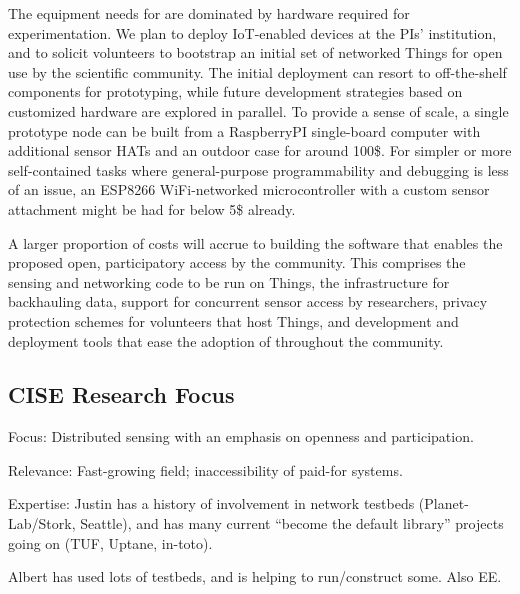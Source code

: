 The equipment needs for \sysname are dominated by hardware required
for experimentation. We plan to deploy \gls{IoT}-enabled devices
at the PIs' institution, and to solicit volunteers to bootstrap an
initial set of networked Things for open use by the scientific community.
The initial deployment can resort to off-the-shelf components
for prototyping, while future development strategies based on
customized hardware are explored in parallel.
To provide a sense of scale, a single prototype node can be built
from a RaspberryPI single-board computer with additional sensor
\glspl{HAT} and an outdoor case for around 100\$.
For simpler or more self-contained tasks where general-purpose
programmability and debugging is less of an issue, an ESP8266
WiFi-networked microcontroller with a custom sensor attachment
might be had for below 5\$ already.

A larger proportion of costs will accrue to building the software
that enables the proposed open, participatory access by the community.
This comprises the sensing and networking code to be run on Things,
the infrastructure for backhauling data, support for concurrent
sensor access by researchers, privacy protection schemes for
volunteers that host Things, and development and deployment tools
that ease the adoption of \sysname throughout the community.


\subsection{CISE Research Focus}

Focus: Distributed sensing with an emphasis on openness and participation.

Relevance: Fast-growing field; inaccessibility of paid-for systems.

Expertise: Justin has a history of involvement in network testbeds
(Planet-Lab/Stork, Seattle), and has many current ``become the default
library'' projects going on (TUF, Uptane, in-toto).

Albert has used lots of testbeds, and is helping to run/construct some.
Also EE.


